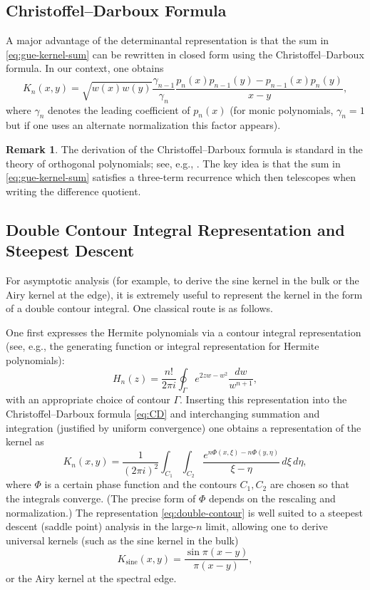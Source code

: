 \documentclass[letterpaper,11pt,oneside,reqno]{article}
\numberwithin{equation}{section}
\theoremstyle{definition}
\newtheorem{remark}[proposition]{Remark}
\begin{document}
\subsection{Christoffel--Darboux Formula}
A major advantage of the determinantal representation is that the sum in \eqref{eq:gue-kernel-sum} can be rewritten in closed form using the Christoffel--Darboux formula. In our context, one obtains
\begin{equation}
\label{eq:CD}
K_n(x,y)=\sqrt{w(x)w(y)}\frac{\gamma_{n-1}}{\gamma_n}\frac{p_n(x)p_{n-1}(y)-p_{n-1}(x)p_n(y)}{x-y},
\end{equation}
where $\gamma_n$ denotes the leading coefficient of $p_n(x)$ (for monic polynomials, $\gamma_n=1$ but if one uses an alternate normalization this factor appears).

\begin{remark}
The derivation of the Christoffel--Darboux formula is standard in the theory of orthogonal polynomials; see, e.g., \cite{szego1975orthogonal}. The key idea is that the sum in \eqref{eq:gue-kernel-sum} satisfies a three-term recurrence which then telescopes when writing the difference quotient.
\end{remark}

\subsection{Double Contour Integral Representation and Steepest Descent}
For asymptotic analysis (for example, to derive the sine kernel in the bulk or the Airy kernel at the edge), it is extremely useful to represent the kernel in the form of a double contour integral. One classical route is as follows.

One first expresses the Hermite polynomials via a contour integral representation (see, e.g., the generating function or integral representation for Hermite polynomials):
\[
H_n(z)=\frac{n!}{2\pi i}\oint_\Gamma e^{2zw-w^2}\frac{dw}{w^{n+1}},
\]
with an appropriate choice of contour $\Gamma$. Inserting this representation into the Christoffel--Darboux formula \eqref{eq:CD} and interchanging summation and integration (justified by uniform convergence) one obtains a representation of the kernel as
\begin{equation}
\label{eq:double-contour}
K_n(x,y)=\frac{1}{(2\pi i)^2}\int_{C_1}\int_{C_2} \frac{e^{n\Phi(x,\xi)-n\Phi(y,\eta)}}{\xi-\eta}\,d\xi\,d\eta,
\end{equation}
where $\Phi$ is a certain phase function and the contours $C_1,C_2$ are chosen so that the integrals converge. (The precise form of $\Phi$ depends on the rescaling and normalization.) The representation \eqref{eq:double-contour} is well suited to a steepest descent (saddle point) analysis in the large-$n$ limit, allowing one to derive universal kernels (such as the sine kernel in the bulk)
\[
K_{\mathrm{sine}}(x,y)=\frac{\sin\pi(x-y)}{\pi(x-y)},
\]
or the Airy kernel at the spectral edge.
\end{document}
